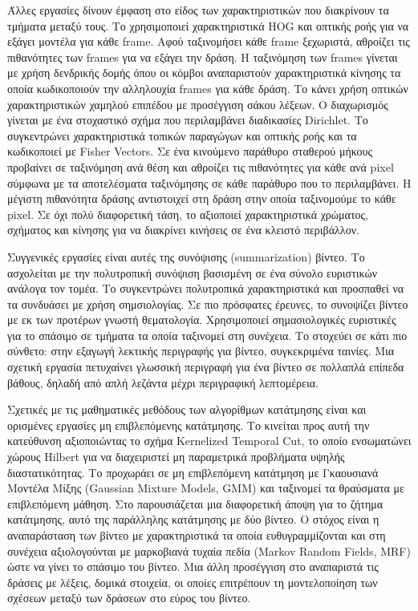 \documentclass[11pt,a4paper,english,greek,twoside]{../Thesis}
\begin{document}
\par Άλλες εργασίες δίνουν έμφαση στο είδος των χαρακτηριστικών που διακρίνουν τα τμήματα μεταξύ τους. Το \cite{jiang_2012} χρησιμοποιεί χαρακτηριστικά HOG και οπτικής ροής για να εξάγει μοντέλα για κάθε frame. Αφού ταξινομήσει κάθε frame ξεχωριστά, αθροίζει τις πιθανότητες των frames για να εξάγει την δράση. Η ταξινόμηση των frames γίνεται με χρήση δενδρικής δομής όπου οι κόμβοι αναπαριστούν χαρακτηριστικά κίνησης τα οποία κωδικοποιούν την αλληλουχία frames για κάθε δράση. Το \cite{buchsbaum_2011} κάνει χρήση οπτικών χαρακτηριστικών χαμηλού επιπέδου με προσέγγιση σάκου λέξεων. Ο διαχωρισμός γίνεται με ένα στοχαστικό σχήμα που περιλαμβάνει διαδικασίες Dirichlet. Το \cite{carvajal_2016} συγκεντρώνει χαρακτηριστικά τοπικών παραγώγων και οπτικής ροής και τα κωδικοποιεί με Fisher Vectors. Σε ένα κινούμενο παράθυρο σταθερού μήκους προβαίνει σε ταξινόμηση ανά θέση και αθροίζει τις πιθανότητες για κάθε ανά pixel σύμφωνα με τα αποτελέσματα ταξινόμησης σε κάθε παράθυρο που το περιλαμβάνει. Η μέγιστη πιθανότητα δράσης αντιστοιχεί στη δράση στην οποία ταξινομούμε το κάθε pixel. Σε όχι πολύ διαφορετική τάση, το \cite{shao_2011} αξιοποιεί χαρακτηριστικά χρώματος, σχήματος και κίνησης για να διακρίνει κινήσεις σε ένα κλειστό περιβάλλον.

\par Συγγενικές εργασίες είναι αυτές της συνόψισης (summarization) βίντεο. Το \cite{pan_2004} ασχολείται με την πολυτροπική συνόψιση βασισμένη σε ένα σύνολο ευριστικών ανάλογα τον τομέα. Το \cite{hames_2005} συγκεντρώνει πολυτροπικά χαρακτηριστικά και προσπαθεί να τα συνδυάσει με χρήση σημσιολογίας. Σε πιο πρόσφατες έρευνες, το \cite{potapov_2014} συνοψίζει βίντεο με εκ των προτέρων γνωστή θεματολογία. Χρησιμοποιεί σημασιολογικές ευριστικές για το σπάσιμο σε τμήματα τα οποία ταξινομεί στη συνέχεια. Το \cite{rohrbach_2016} στοχεύει σε κάτι πιο σύνθετο: στην εξαγωγή λεκτικής περιγραφής για βίντεο, συγκεκριμένα ταινίες. Μια σχετική εργασία \cite{senina_2014} πετυχαίνει γλωσσική περιγραφή για ένα βίντεο σε πολλαπλά επίπεδα βάθους, δηλαδή από απλή λεζάντα μέχρι περιγραφική λεπτομέρεια.

\par Σχετικές με τις μαθηματικές μεθόδους των αλγορίθμων κατάτμησης είναι και ορισμένες εργασίες μη επιβλεπόμενης κατάτμησης. Το \cite{gong_2012} κινείται προς αυτή την κατεύθυνση αξιοποιώντας το σχήμα Kernelized Temporal Cut, το οποίο ενσωματώνει χώρους Hilbert για να διαχειριστεί μη παραμετρικά προβλήματα υψηλής διαστατικότητας. Το \cite{spriggs_2009} προχωράει σε μη επιβλεπόμενη κατάτμηση με Γκαουσιανά Μοντέλα Μίξης (Gaussian Mixture Models, GMM) και ταξινομεί τα θραύσματα με επιβλεπόμενη μάθηση. Στο \cite{guo_2013} παρουσιάζεται μια διαφορετική άποψη για το ζήτημα κατάτμησης, αυτό της παράλληλης κατάτμησης με δύο βίντεο. Ο στόχος είναι η αναπαράσταση των βίντεο με χαρακτηριστικά τα οποία ευθυγραμμίζονται και στη συνέχεια αξιολογούνται με μαρκοβιανά τυχαία πεδία (Markov Random Fields, MRF) ώστε να γίνει το σπάσιμο του βίντεο. Μια άλλη προσέγγιση στο \cite{wu_2015} αναπαριστά τις δράσεις με λέξεις, δομικά στοιχεία, οι οποίες επιτρέπουν τη μοντελοποίηση των σχέσεων μεταξύ των δράσεων στο εύρος του βίντεο.
\end{document}
